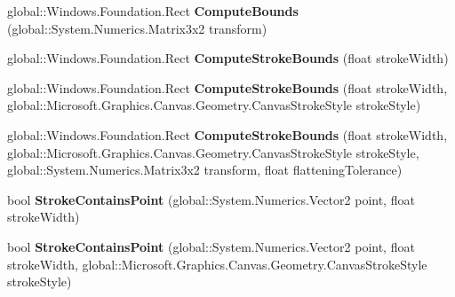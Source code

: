 \begin{DoxyCompactItemize}
global\+::\+Windows.\+Foundation.\+Rect {\bfseries Compute\+Bounds} (global\+::\+System.\+Numerics.\+Matrix3x2 transform)
\item 
\mbox{\label{interface_microsoft_1_1_graphics_1_1_canvas_1_1_geometry_1_1_i_canvas_geometry_a85348d384cde919169814908c2636f61}} 
global\+::\+Windows.\+Foundation.\+Rect {\bfseries Compute\+Stroke\+Bounds} (float stroke\+Width)
\item 
\mbox{\label{interface_microsoft_1_1_graphics_1_1_canvas_1_1_geometry_1_1_i_canvas_geometry_a9a080ab4d42be333c23db1f84a78c37b}} 
global\+::\+Windows.\+Foundation.\+Rect {\bfseries Compute\+Stroke\+Bounds} (float stroke\+Width, global\+::\+Microsoft.\+Graphics.\+Canvas.\+Geometry.\+Canvas\+Stroke\+Style stroke\+Style)
\item 
\mbox{\label{interface_microsoft_1_1_graphics_1_1_canvas_1_1_geometry_1_1_i_canvas_geometry_a79b506c76a36146c8bcf102953a9e348}} 
global\+::\+Windows.\+Foundation.\+Rect {\bfseries Compute\+Stroke\+Bounds} (float stroke\+Width, global\+::\+Microsoft.\+Graphics.\+Canvas.\+Geometry.\+Canvas\+Stroke\+Style stroke\+Style, global\+::\+System.\+Numerics.\+Matrix3x2 transform, float flattening\+Tolerance)
\item 
\mbox{\label{interface_microsoft_1_1_graphics_1_1_canvas_1_1_geometry_1_1_i_canvas_geometry_acdb5842e23cf49f65d75966833fcdeda}} 
bool {\bfseries Stroke\+Contains\+Point} (global\+::\+System.\+Numerics.\+Vector2 point, float stroke\+Width)
\item 
\mbox{\label{interface_microsoft_1_1_graphics_1_1_canvas_1_1_geometry_1_1_i_canvas_geometry_a749861cc7df09da3d826703f624d3aa2}} 
bool {\bfseries Stroke\+Contains\+Point} (global\+::\+System.\+Numerics.\+Vector2 point, float stroke\+Width, global\+::\+Microsoft.\+Graphics.\+Canvas.\+Geometry.\+Canvas\+Stroke\+Style stroke\+Style)
\item 
\mbox{\label{interface_microsoft_1_1_graphics_1_1_canvas_1_1_geometry_1_1_i_canvas_geometry_a8c8e0234f10f24e16c5e23af24012c5a}} 

\end{DoxyCompactItemize}

